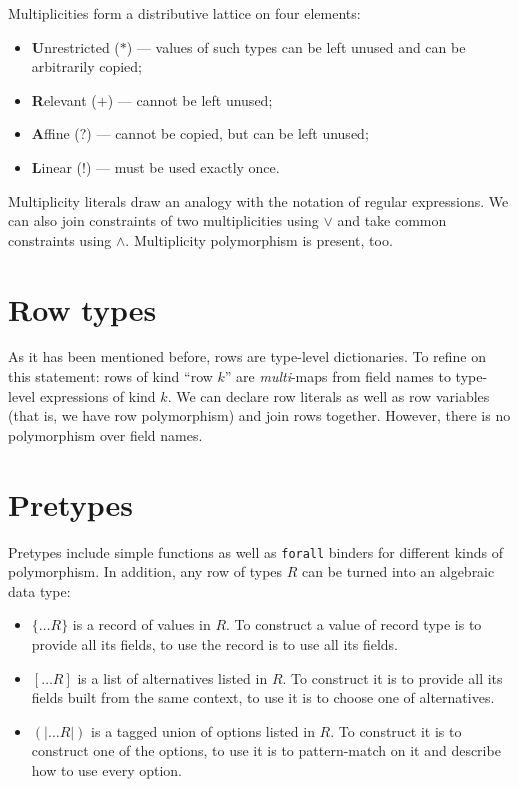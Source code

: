 \documentclass[a4paper,14pt]{extreport}
\begin{document}
Multiplicities form a distributive lattice on four elements:

\begin{itemize}
    \item \textbf{U}nrestricted ($*$) --- values of such types can be left
        unused and can be arbitrarily copied;
    \item \textbf{R}elevant ($+$) --- cannot be left unused;
    \item \textbf{A}ffine ($?$) --- cannot be copied, but can be left unused;
    \item \textbf{L}inear ($!$) --- must be used exactly once.
\end{itemize}

Multiplicity literals draw an analogy with the notation of regular expressions.
We can also join constraints of two multiplicities using $\lor$ and take common
constraints using $\land$. Multiplicity polymorphism is present, too.

\section{Row types}

As it has been mentioned before, rows are type-level dictionaries. To refine on
this statement: rows of kind ``row $k$'' are \textit{multi}-maps from field
names to type-level expressions of kind $k$. We can declare row literals as well
as row variables (that is, we have row polymorphism) and join rows together.
However, there is no polymorphism over field names.

\section{Pretypes}

Pretypes include simple functions as well as \verb|forall| binders for different
kinds of polymorphism. In addition, any row of types $R$ can be turned into an
algebraic data type:

\begin{itemize}
    \item $\{\dots R\}$ is a record of values in $R$. To construct a value of
        record type is to provide all its fields, to use the record is to use
        all its fields.
    \item $[\dots R]$ is a list of alternatives listed in $R$. To construct it
        is to provide all its fields built from the same context, to use it is
        to choose one of alternatives.
    \item $(|\dots R|)$ is a tagged union of options listed in $R$. To construct
        it is to construct one of the options, to use it is to pattern-match on
        it and describe how to use every option.
\end{itemize}
\end{document}
